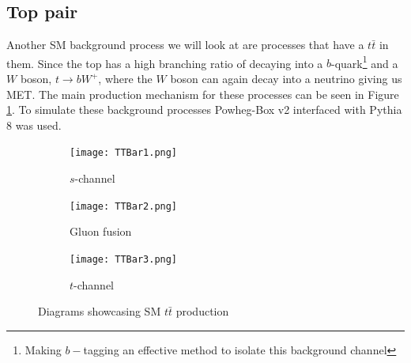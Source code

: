 \documentclass[12pt, a4paper]{book}
\begin{document}
\subsection{Top pair}
Another SM background process we will look at are processes that have a $t\bar{t}$ in them. Since the top has a high branching ratio of decaying into a $b$-quark\footnote{Making $b-$tagging an effective method to isolate this background channel} and a $W$ boson, $t\rightarrow bW^+$, where the $W$ boson can again decay into a neutrino giving 
us MET. The main production mechanism for these processes can be seen in Figure \ref{fig:TT_BKG}. To simulate these background processes Powheg-Box v2 \cite{PowHeg} interfaced with Pythia 8 \cite{Pythia} was used.
\begin{figure}[!ht]
    \centering
    \begin{subfigure}[b]{0.3\textwidth}
        \centering
        \texttt{[image: TTBar1.png]}
        \caption{$s$-channel}
    \end{subfigure}
    \hfill
    \begin{subfigure}[b]{0.3\textwidth}
        \centering
        \texttt{[image: TTBar2.png]}
        \caption{Gluon fusion}
    \end{subfigure}
    \hfill
    \begin{subfigure}[b]{0.3\textwidth}
        \centering
        \texttt{[image: TTBar3.png]}
        \caption{$t$-channel}
    \end{subfigure}
    \caption[$t\bar{t}$ production]{Diagrams showcasing SM $t\bar{t}$ production}\label{fig:TT_BKG}
\end{figure}
\end{document}
